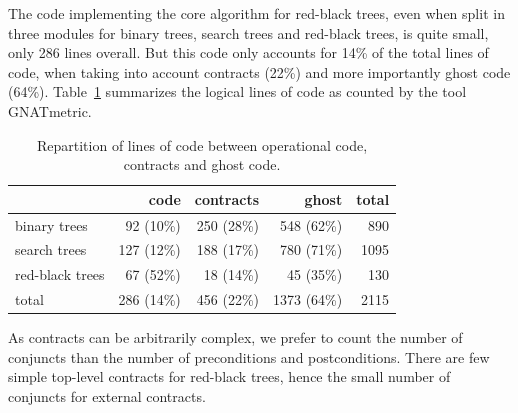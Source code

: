 \documentclass{llncs}
\begin{document}
The code implementing the core algorithm for red-black trees, even when split
in three modules for binary trees, search trees and red-black trees, is quite
small, only 286 lines overall. But this code only accounts for 14\% of the
total lines of code, when taking into account contracts (22\%) and more
importantly ghost code (64\%). Table~\ref{tab-sloc} summarizes the logical
lines of code as counted by the tool GNATmetric.

\begin{table}[h]
\begin{center}
\begin{tabular}{l|rrr|r}
                & code       & contracts  &      ghost  & total \\ \hline
binary trees    & 92  (10\%) & 250 (28\%) & 548  (62\%) & 890 \\
search trees    & 127 (12\%) & 188 (17\%) & 780  (71\%) & 1095 \\
red-black trees & 67  (52\%) & 18  (14\%) & 45   (35\%) & 130 \\ \hline
total           & 286 (14\%) & 456 (22\%) & 1373 (64\%) & 2115 \\
\end{tabular}
\vspace*{5mm}
\caption{\label{tab-sloc} Repartition of lines of code between operational code, contracts and ghost code.}
\vspace*{-10mm}
\end{center}
\end{table}

As contracts can be arbitrarily complex, we prefer to count
the number of conjuncts than the number of preconditions and
postconditions. 
There are few simple top-level contracts for red-black trees, hence
the small number of conjuncts for external contracts.
\end{document}
